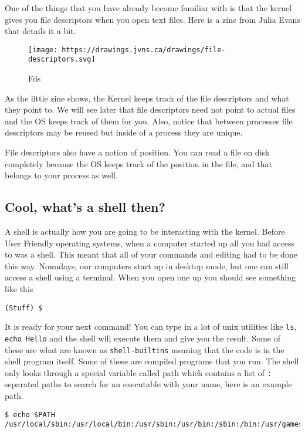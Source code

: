 One of the things that you have already become familiar with is that the
kernel gives you file descriptors when you open text files. Here is a
zine from Julia Evans that details it a bit.

\begin{figure}[htbp]
\centering
\texttt{[image: https://drawings.jvns.ca/drawings/file-descriptors.svg]}
\caption{Fds}
\end{figure}

As the little zine shows, the Kernel keeps track of the file descriptors
and what they point to. We will see later that file descriptors need not
point to actual files and the OS keeps track of them for you. Also,
notice that between processes file descriptors may be reused but inside
of a process they are unique.

File descriptors also have a notion of position. You can read a file on
disk completely because the OS keeps track of the position in the file,
and that belongs to your process as well.

\subsection{Cool, what's a shell then?}\label{cool-whats-a-shell-then}

A shell is actually how you are going to be interacting with the kernel.
Before User Friendly operating systems, when a computer started up all
you had access to was a shell. This meant that all of your commands and
editing had to be done this way. Nowadays, our computers start up in
desktop mode, but one can still access a shell using a terminal. When
you open one up you should see something like this

\begin{verbatim}
(Stuff) $
\end{verbatim}

It is ready for your next command! You can type in a lot of unix
utilities like \texttt{ls}, \texttt{echo\ Hello} and the shell will
execute them and give you the result. Some of these are what are known
as \texttt{shell-builtins} meaning that the code is in the shell program
itself. Some of these are compiled programs that you run. The shell only
looks through a special variable called path which contains a list of
\texttt{:} separated paths to search for an executable with your name,
here is an example path.

\begin{verbatim}
$ echo $PATH
/usr/local/sbin:/usr/local/bin:/usr/sbin:/usr/bin:/sbin:/bin:/usr/games:/usr/local/games
\end{verbatim}

